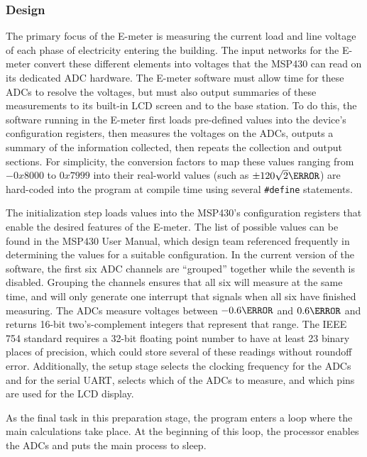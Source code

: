 \subsubsection{Design}
The primary focus of the E-meter is measuring the current load and
line voltage of each phase of electricity entering the building. The
input networks for the E-meter convert these different elements into
voltages that the MSP430 can read on its dedicated \ac{ADC}
hardware. The E-meter software must allow time for these \acp{ADC} to
resolve the voltages, but must also output summaries of these
measurements to its built-in LCD screen and to the base station. To do
this, the software running in the E-meter first loads pre-defined
values into the device's configuration registers, then measures the
voltages on the \acp{ADC}, outputs a summary of the information
collected, then repeats the collection and output sections. For
simplicity, the conversion factors to map these values ranging from
$-0x8000$ to $0x7999$ into their real-world values (such as $\pm
120\sqrt{2}\volt$) are hard-coded into the program at compile time
using several \texttt{\#define} statements.

The initialization step loads values into the MSP430's configuration
registers that enable the desired features of the E-meter. The list of
possible values can be found in the MSP430 User Manual\cite{slau056j},
which design team referenced frequently in determining the values for a 
suitable configuration. In the current version of the software, the
first six \ac{ADC} channels are ``grouped'' together while the seventh is
disabled. Grouping the channels ensures that all six will measure at
the same time, and will only generate one interrupt that signals when
all six have finished measuring. The \acp{ADC} measure voltages
between $-0.6 \volt$ and $0.6 \volt$ and returns 16-bit
two's-complement integers that represent that range. The \ac{IEEE} 754
standard requires a 32-bit floating point number to have at least 23
binary places of precision, which could store several of these
readings without roundoff error. Additionally, the setup stage selects
the clocking frequency for the \acp{ADC} and for the serial \ac{UART},
selects which of the \acp{ADC} to measure, and which pins are used for
the \ac{LCD} display.

As the final task in this preparation stage, the program
enters a loop where the main calculations take place. At the beginning
of this loop, the processor enables the \acp{ADC} and puts the main
process to sleep.

